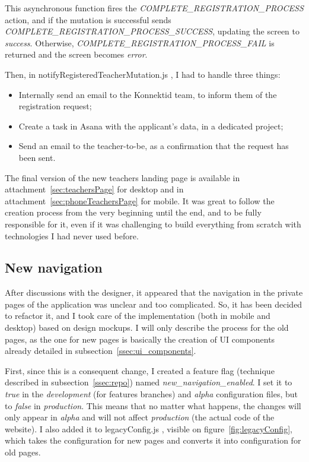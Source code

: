 This asynchronous function fires the \textit{COMPLETE\_REGISTRATION\_PROCESS} action, and if the mutation is successful sends \textit{COMPLETE\_REGISTRATION\_PROCESS\_SUCCESS}, updating the screen to \textit{success}. Otherwise, \textit{COMPLETE\_REGISTRATION\_PROCESS\_FAIL} is returned and the screen becomes \textit{error}.

Then, in \guillemotleft{} notifyRegisteredTeacherMutation.js \guillemotright{}, I had to handle three things:
\begin{itemize}[noitemsep]
    \item Internally send an email to the Konnektid team, to inform them of the registration request;
    \item Create a task in Asana with the applicant's data, in a dedicated project;
    \item Send an email to the teacher-to-be, as a confirmation that the request has been sent.
\end{itemize}

The final version of the new teachers landing page is available in {\sc attachment}~\ref{sec:teachersPage} for desktop and in {\sc attachment}~\ref{sec:phoneTeachersPage} for mobile. It was great to follow the creation process from the very beginning until the end, and to be fully responsible for it, even if it was challenging to build everything from scratch with technologies I had never used before.

\subsection{New navigation}
\label{ssec:new_nav}

After discussions with the designer, it appeared that the navigation in the private pages of the application was unclear and too complicated. So, it has been decided to refactor it, and I took care of the implementation (both in mobile and desktop) based on design mockups. I will only describe the process for the old pages, as the one for new pages is basically the creation of UI components already detailed in {\sc subsection}~\ref{ssec:ui_components}.

First, since this is a consequent change, I created a feature flag (technique described in {\sc subsection}~\ref{ssec:repo}) named \textit{new\_navigation\_enabled}. I set it to \textit{true} in the \textit{development} (for features branches) and \textit{alpha} configuration files, but to \textit{false} in \textit{production}. This means that no matter what happens, the changes will only appear in \textit{alpha} and will not affect \textit{production} (the actual code of the website). I also added it to \guillemotleft{} legacyConfig.js \guillemotright{}, visible on {\sc figure}~\ref{fig:legacyConfig}, which takes the configuration for new pages and converts it into configuration for old pages.

